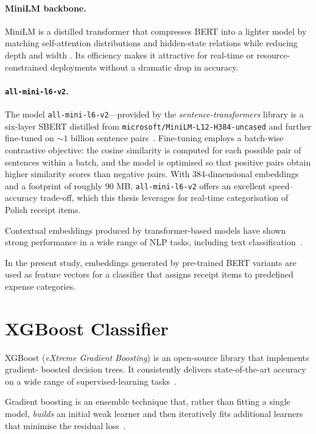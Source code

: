 \documentclass{SGGW-thesis-EN}
\begin{document}
\paragraph{MiniLM backbone.}
MiniLM is a distilled transformer that compresses BERT into a lighter model by matching
self-attention distributions and hidden-state relations while reducing depth and width
\cite{wang2020minilm}.
Its efficiency makes it attractive for real-time or resource-constrained deployments without
a dramatic drop in accuracy.

\paragraph{\texttt{all-mini-l6-v2}.}
The model \texttt{all-mini-l6-v2}—provided by the \emph{sentence-transformers} library is a
six-layer SBERT distilled from \texttt{microsoft/MiniLM-L12-H384-uncased} and further
fine-tuned on \(\sim 1\) billion sentence pairs~\cite{reimers2021allminilm}.
Fine-tuning employs a batch-wise contrastive objective: the cosine similarity is computed for
each possible pair of sentences within a batch, and the model is optimised so that positive
pairs obtain higher similarity scores than negative pairs.
With 384-dimensional embeddings and a footprint of roughly 90 MB,
\texttt{all-mini-l6-v2} offers an excellent speed–accuracy trade-off, which this thesis
leverages for real-time categorisation of Polish receipt items.

Contextual embeddings produced by transformer-based models have shown strong performance in a
wide range of NLP tasks, including text classification~\cite{devlin2019bertpretrainingdeepbidirectional}.

In the present study, embeddings generated by pre-trained BERT variants are used as feature
vectors for a classifier that assigns receipt items to predefined expense categories.

\section{XGBoost Classifier}

XGBoost (\emph{eXtreme Gradient Boosting}) is an open-source library that implements gradient-
boosted decision trees.
It consistently delivers state-of-the-art accuracy on a wide range of supervised-learning tasks~\cite{Chen_2016}.

Gradient boosting is an ensemble technique that, rather than fitting a single model,
\emph{builds} an initial weak learner and then iteratively fits additional learners that
minimise the residual loss~\cite{natekin2013gradient}.
\end{document}
